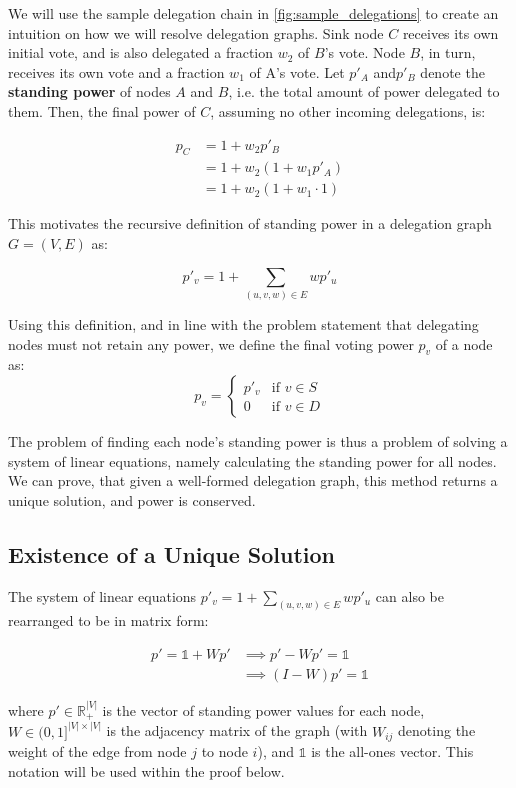 We will use the sample delegation chain in \cref{fig:sample_delegations} to create an intuition on how we will resolve delegation graphs. Sink node $C$ receives its own initial vote, and is also delegated a fraction $w_2$ of $B$'s vote. Node $B$, in turn, receives its own vote and a fraction $w_1$ of A's vote. Let $p'_A$ and$ p'_B$ denote the \textbf{standing power} of nodes $A$ and $B$, i.e. the total amount of power delegated to them. Then, the final power of $C$, assuming no other incoming delegations, is:

\begin{align*}
p_C &= 1 + w_2p'_B \\
&= 1 + w_2(1 + w_1p'_A) \\
&= 1 + w_2(1 + w_1 \cdot 1)
\end{align*}

This motivates the recursive definition of standing power in a delegation graph $G = (V, E)$ as:

\[
p'_v = 1 + \sum_{(u, v, w) \in E} wp'_u
\]

Using this definition, and in line with the problem statement that delegating nodes must not retain any power, we define the final voting power $p_v$ of a node as:
\[
p_v = 
\begin{cases}
p'_v & \text{if } v \in S \\
0     & \text{if } v \in D
\end{cases}
\]

The problem of finding each node's standing power is thus a problem of solving a system of linear equations, namely calculating the standing power for all nodes. We can prove, that given a well-formed delegation graph, this method returns a unique solution, and power is conserved.

\subsection{Existence of a Unique Solution}
\label{subsec:unique_sol}

The system of linear equations $p'_v = 1 + \sum_{(u, v, w) \in E} wp'_u$ can also be rearranged to be in matrix form: 

\begin{align*}
p' = \mathbb{1} + Wp' &\implies p' - Wp' = \mathbb{1} \\
&\implies (I - W)p' = \mathbb{1}
\end{align*}

where \( p' \in \mathbb{R}_+^{|V|} \) is the vector of standing power values for each node, \( W \in (0, 1]^{|V| \times |V|} \) is the adjacency matrix of the graph (with \( W_{ij} \) denoting the weight of the edge from node \( j \) to node \( i \)), and \( \mathbb{1} \) is the all-ones vector. This notation will be used within the proof below.

